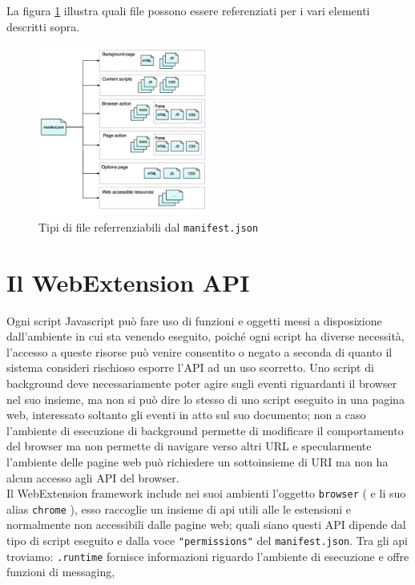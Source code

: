 \documentclass{sapthesis}
\newcommand{\code}[1]{\texttt{#1}}
\newcommand{\attr}[1]{\code{.#1}}
\newcommand{\JS}{Javascript }
\newcommand{\manifest}{\code{manifest.json}}
\begin{document}
        La figura \ref{fig:manifest-content} illustra quali file possono essere referenziati per i vari elementi descritti sopra.

        \begin{figure}[ht]
            \centering                                                  
            \includegraphics[width=0.5\textwidth]{webextension-manifest-content}
            \caption{Tipi di file referrenziabili dal \manifest }
            \label{fig:manifest-content}                             
        \end{figure}

    \section{Il WebExtension API}
    \label{webextension-api}
        Ogni script \JS può fare uso di funzioni e oggetti messi a disposizione dall'ambiente in cui sta venendo
        eseguito, poiché ogni script ha diverse necessità, l'accesso a queste risorse può venire consentito o negato
        a seconda di quanto il sistema consideri rischioso esporre l'API ad un uso scorretto. Uno script di background
        deve necessariamente poter agire sugli eventi riguardanti il browser nel suo insieme, ma non si può dire lo
        stesso di uno script eseguito in una pagina web, interessato soltanto gli eventi in atto sul suo documento;
        non a caso l'ambiente di esecuzione di background permette di modificare il comportamento del
        browser ma non permette di navigare verso altri URL e specularmente l'ambiente delle pagine web può
        richiedere un sottoinsieme di URI ma non ha alcun accesso agli API del browser.\\
        Il WebExtension framework include nei suoi ambienti l'oggetto \code{browser} ( e li suo alias \code{chrome} ),
        esso raccoglie un insieme di api utili alle le estensioni e normalmente non accessibili dalle pagine web;
        quali siano questi API dipende dal tipo di script eseguito e dalla voce \code{"permissions"} del \manifest.
        Tra gli api troviamo: \attr{runtime} \cite{browser-runtime} fornisce informazioni riguardo l'ambiente di 
        esecuzione e offre funzioni di messaging, 
    
\end{document}
